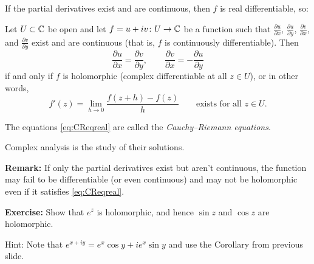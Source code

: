 \documentclass[10pt,aspectratio=169]{beamer}
\begin{document}
\begin{frame}

If the partial derivatives exist and are continuous, then $f$ is real
differentiable, so:

\pause

\begin{corollary}
Let $U \subset {\mathbb{C}}$ be open and let $f = u+iv \colon U \to {\mathbb{C}}$ be a function
such that $\frac{\partial u}{\partial x}$, $\frac{\partial u}{\partial y}$, $\frac{\partial
v}{\partial x}$, and $\frac{\partial v}{\partial y}$ exist and are continuous (that is,
$f$ is continuously differentiable).
\pause
Then
\begin{equation} \label{eq:CReqreal}
\frac{\partial u}{\partial x} = \frac{\partial v}{\partial y} , \qquad
\frac{\partial v}{\partial x} = -\frac{\partial u}{\partial y}
\end{equation}
if and only if $f$ is holomorphic (complex differentiable at all $z \in U$),
\pause
or in other words,
\begin{equation*}
f'(z) =
\lim_{h \to 0} \frac{f(z+h) - f(z)}{h}
\qquad
\text{exists for all $z \in U$.}
\end{equation*}
\end{corollary}

\pause

The equations \eqref{eq:CReqreal} are called the
\emph{Cauchy--Riemann equations}.

\medskip
\pause

Complex analysis is the study of their solutions.

\medskip
\pause

\textbf{Remark:} If only the partial derivatives exist but aren't
continuous, the function may fail to be differentiable (or even continuous)
and may not be holomorphic even if it satisfies
\eqref{eq:CReqreal}.

\end{frame}

\begin{frame}
\textbf{Exercise:}
Show that $e^z$ is holomorphic, and hence $\sin z$ and $\cos z$ are
holomorphic.

\medskip
\pause

Hint: Note that $e^{x+iy} = e^x \cos y + i e^x \sin y$ and use the
Corollary from previous slide.
\end{frame}
\end{document}
